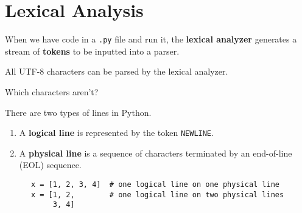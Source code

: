 \section{Lexical Analysis} 

  When we have code in a \texttt{.py} file and run it, the \textbf{lexical analyzer} generates a stream of \textbf{tokens} to be inputted into a parser. 

  \begin{theorem}
    All UTF-8 characters can be parsed by the lexical analyzer. 
  \end{theorem}

  \begin{question}
    Which characters aren't? 
  \end{question}

  \begin{definition} 
    There are two types of lines in Python. 
    \begin{enumerate}
      \item A \textbf{logical line} is represented by the token \texttt{NEWLINE}. 
      \item A \textbf{physical line} is a sequence of characters terminated by an end-of-line (EOL) sequence. 
    \end{enumerate} 
    \begin{lstlisting}
      x = [1, 2, 3, 4]  # one logical line on one physical line 
      x = [1, 2,        # one logical line on two physical lines
           3, 4]
    \end{lstlisting}
  \end{definition} 
